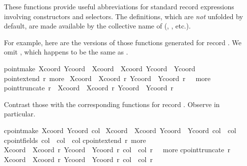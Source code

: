 \begin{isabellebody}
\begin{isamarkuptext}
\begin{itemize}
  \end{itemize}

  These functions provide useful abbreviations for standard
  record expressions involving constructors and selectors.  The
  definitions, which are \emph{not} unfolded by default, are made
  available by the collective name of  (, , etc.).

  For example, here are the versions of those functions generated for
  record .  We omit , which happens to
  be the same as .

  \begin{isabelle}%
point{\isachardot}make\ Xcoord\ Ycoord\ {\isasymequiv}\ {\isasymlparr}Xcoord\ {\isacharequal}\ Xcoord{\isacharcomma}\ Ycoord\ {\isacharequal}\ Ycoord{\isasymrparr}\isasep\isanewline%
point{\isachardot}extend\ r\ more\ {\isasymequiv}\isanewline
{\isasymlparr}Xcoord\ {\isacharequal}\ Xcoord\ r{\isacharcomma}\ Ycoord\ {\isacharequal}\ Ycoord\ r{\isacharcomma}\ {\isasymdots}\ {\isacharequal}\ more{\isasymrparr}\isasep\isanewline%
point{\isachardot}truncate\ r\ {\isasymequiv}\ {\isasymlparr}Xcoord\ {\isacharequal}\ Xcoord\ r{\isacharcomma}\ Ycoord\ {\isacharequal}\ Ycoord\ r{\isasymrparr}%
\end{isabelle}

  Contrast those with the corresponding functions for record .  Observe  in particular.

  \begin{isabelle}%
cpoint{\isachardot}make\ Xcoord\ Ycoord\ col\ {\isasymequiv}\isanewline
{\isasymlparr}Xcoord\ {\isacharequal}\ Xcoord{\isacharcomma}\ Ycoord\ {\isacharequal}\ Ycoord{\isacharcomma}\ col\ {\isacharequal}\ col{\isasymrparr}\isasep\isanewline%
cpoint{\isachardot}fields\ col\ {\isasymequiv}\ {\isasymlparr}col\ {\isacharequal}\ col{\isasymrparr}\isasep\isanewline%
cpoint{\isachardot}extend\ r\ more\ {\isasymequiv}\isanewline
{\isasymlparr}Xcoord\ {\isacharequal}\ Xcoord\ r{\isacharcomma}\ Ycoord\ {\isacharequal}\ Ycoord\ r{\isacharcomma}\ col\ {\isacharequal}\ col\ r{\isacharcomma}\ {\isasymdots}\ {\isacharequal}\ more{\isasymrparr}\isasep\isanewline%
cpoint{\isachardot}truncate\ r\ {\isasymequiv}\isanewline
{\isasymlparr}Xcoord\ {\isacharequal}\ Xcoord\ r{\isacharcomma}\ Ycoord\ {\isacharequal}\ Ycoord\ r{\isacharcomma}\ col\ {\isacharequal}\ col\ r{\isasymrparr}%
\end{isabelle}


\end{isamarkuptext}
\end{isabellebody}
